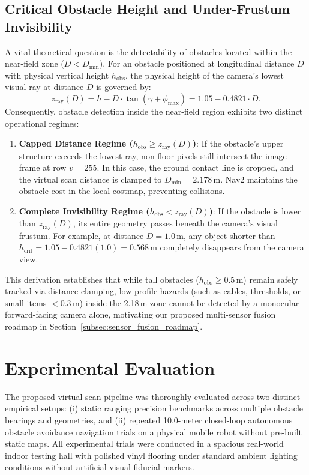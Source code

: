 \documentclass{ieeeaccess}
\begin{document}
\subsection{Critical Obstacle Height and Under-Frustum Invisibility}
\label{subsec:critical_height}
A vital theoretical question is the detectability of obstacles located within the near-field zone ($D < D_{\min}$). For an obstacle positioned at longitudinal distance $D$ with physical vertical height $h_{\mathrm{obs}}$, the physical height of the camera's lowest visual ray at distance $D$ is governed by:
\begin{equation}
  z_{\mathrm{ray}}(D) = h - D \cdot \tan(\gamma + \phi_{\max}) = 1.05 - 0.4821 \cdot D.
  \label{eq:ray_height}
\end{equation}
Consequently, obstacle detection inside the near-field region exhibits two distinct operational regimes:
\begin{enumerate}
  \item \textbf{Capped Distance Regime ($h_{\mathrm{obs}} \ge z_{\mathrm{ray}}(D)$)}: If the obstacle's upper structure exceeds the lowest ray, non-floor pixels still intersect the image frame at row $v = 255$. In this case, the ground contact line is cropped, and the virtual scan distance is clamped to $D_{\min} = 2.178$\,m. Nav2 maintains the obstacle cost in the local costmap, preventing collisions.
  \item \textbf{Complete Invisibility Regime ($h_{\mathrm{obs}} < z_{\mathrm{ray}}(D)$)}: If the obstacle is lower than $z_{\mathrm{ray}}(D)$, its entire geometry passes beneath the camera's visual frustum. For example, at distance $D = 1.0$\,m, any object shorter than $h_{\mathrm{crit}} = 1.05 - 0.4821(1.0) = 0.568$\,m completely disappears from the camera view.
\end{enumerate}
This derivation establishes that while tall obstacles ($h_{\mathrm{obs}} \ge 0.5$\,m) remain safely tracked via distance clamping, low-profile hazards (such as cables, thresholds, or small items $<0.3$\,m) inside the 2.18\,m zone cannot be detected by a monocular forward-facing camera alone, motivating our proposed multi-sensor fusion roadmap in Section~\ref{subsec:sensor_fusion_roadmap}.

\section{Experimental Evaluation}
\label{sec:experiments}

The proposed virtual scan pipeline was thoroughly evaluated across two distinct empirical setups: (i) static ranging precision benchmarks across multiple obstacle bearings and geometries, and (ii) repeated 10.0-meter closed-loop autonomous obstacle avoidance navigation trials on a physical mobile robot without pre-built static maps. All experimental trials were conducted in a spacious real-world indoor testing hall with polished vinyl flooring under standard ambient lighting conditions without artificial visual fiducial markers.
\end{document}
